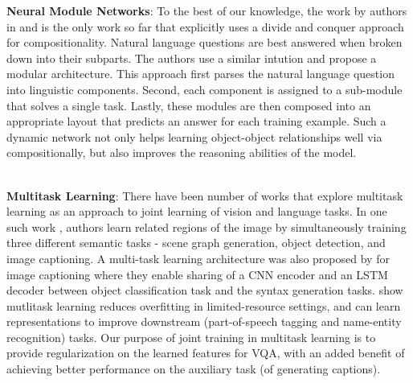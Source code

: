 \noindent\textbf{Neural Module Networks}: To the best of our knowledge, the work by authors in \cite{HuARDS17} and \cite{deepmodulenets} is the only work so far that explicitly uses a divide and conquer approach for compositionality. Natural language questions are best answered when broken down into their subparts. The authors use a similar intution and propose a modular architecture. This approach first parses the natural language question into linguistic components. Second, each component is assigned to a sub-module that solves a single task. Lastly, these modules are then composed into an appropriate layout that predicts an answer for each training example. Such a dynamic network not only helps learning object-object relationships well via compositionally, but also improves the reasoning abilities of the model. %

\\

\noindent\textbf{Multitask Learning}:
There have been number of works that explore multitask learning as an approach to joint learning of vision and language tasks. In one such work \cite{JustinJohnson2018}, authors  learn related regions of the image by simultaneously training three different semantic tasks - scene graph generation, object detection, and image captioning. A multi-task learning architecture was also proposed by \cite{zhao2018multi} for image captioning
where they enable sharing of a CNN encoder and an LSTM decoder
between object classification task and the syntax generation tasks.  \cite{ruder2017overview, lin2018multi} show mutlitask learning reduces overfitting in limited-resource settings, and can learn representations to improve downstream (part-of-speech tagging and name-entity recognition) tasks. Our purpose of joint training in multitask learning is to provide regularization on the learned features for VQA, with an added benefit of achieving better performance on the auxiliary task (of generating captions). 




